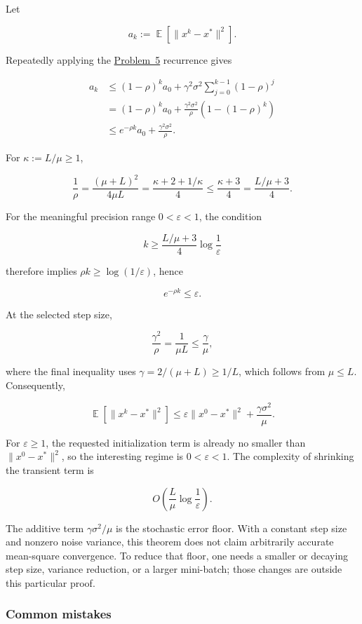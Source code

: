 \documentclass[11pt,a4paper]{article}
\DeclareMathOperator{\E}{\mathbb{E}}
\newcommand{\jump}[2]{\hyperref[#1]{#2}}
\theoremstyle{definition}
\begin{document}
Let

\[
a_k:=\E\left[\|x^k-x^*\|^2\right].
\]

Repeatedly applying the \jump{prob:spr2025-opt-5}{Problem~5} recurrence gives

\begin{align*}
a_k
&\leq(1-\rho)^k a_0
+\gamma^2\sigma^2\sum_{j=0}^{k-1}(1-\rho)^j\\
&=(1-\rho)^k a_0
+\frac{\gamma^2\sigma^2}{\rho}\left(1-(1-\rho)^k\right)\\
&\leq e^{-\rho k}a_0+\frac{\gamma^2\sigma^2}{\rho}.
\end{align*}

For $\kappa:=L/\mu\geq1$,

\[
\frac{1}{\rho}
=\frac{(\mu+L)^2}{4\mu L}
=\frac{\kappa+2+1/\kappa}{4}
\leq\frac{\kappa+3}{4}
=\frac{L/\mu+3}{4}.
\]

For the meaningful precision range $0<\varepsilon<1$, the condition

\[
k\geq\frac{L/\mu+3}{4}\log\frac{1}{\varepsilon}
\]

therefore implies $\rho k\geq\log(1/\varepsilon)$, hence

\[
e^{-\rho k}\leq\varepsilon.
\]

At the selected step size,

\[
\frac{\gamma^2}{\rho}
=\frac{1}{\mu L}
\leq\frac{\gamma}{\mu},
\]

where the final inequality uses $\gamma=2/(\mu+L)\geq1/L$, which follows from $\mu\leq L$. Consequently,

\[
\E\left[\|x^k-x^*\|^2\right]
\leq\varepsilon\|x^0-x^*\|^2+\frac{\gamma\sigma^2}{\mu}.
\]

For $\varepsilon\geq1$, the requested initialization term is already no smaller than $\|x^0-x^*\|^2$, so the interesting regime is $0<\varepsilon<1$. The complexity of shrinking the transient term is

\[
O\left(\frac{L}{\mu}\log\frac{1}{\varepsilon}\right).
\]

The additive term $\gamma\sigma^2/\mu$ is the stochastic error floor. With a constant step size and nonzero noise variance, this theorem does not claim arbitrarily accurate mean-square convergence. To reduce that floor, one needs a smaller or decaying step size, variance reduction, or a larger mini-batch; those changes are outside this particular proof.

\subsubsection{Common mistakes}
\end{document}
